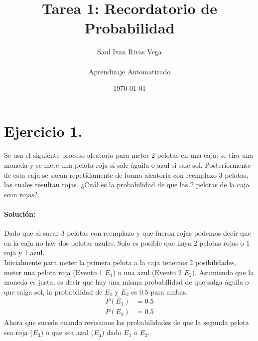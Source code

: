\documentclass[12pt]{article}
\title{Tarea 1: Recordatorio de Probabilidad}
\author{
	Saul Ivan Rivas Vega \\
	\\
	Aprendizaje Automatizado\\
}
\date{\today}
\begin{document}
	\maketitle
	\pagebreak
	\section{Ejercicio 1.}
	  \paragraph{} Se usa el siguiente proceso aleatorio para meter 2 pelotas en una caja: se tira una moneda y
	  se mete una pelota roja si sale águila o azul si sale sol. Posteriormente de esta caja se sacan
	  repetidamente de forma aleatoria con reemplazo 3 pelotas, las cuales resultan rojas. ¿Cuál es
	  la probabilidad de que las 2 pelotas de la caja sean rojas?.
	  \\
	  \paragraph{Solución: } Dado que al sacar 3 pelotas con reemplazo y que fueron rojas podemos decir que en la caja no hay dos pelotas azules. Solo es posible que haya 2 pelotas rojas o 1 roja y 1 azul.
	  \\
	  Inicialmente para meter la primera pelota a la caja tenemos 2 posibilidades, meter una pelota roja (Evento 1 $E_1$) o una azul (Evento 2 $E_2$).
	  Asumiendo que la moneda es justa, es decir que hay una misma probabilidad de que salga águila o que salga sol, la probabilidad de $E_1$ y $E_2$ es $0.5$ para ambas.
	  \begin{equation}
	  \begin{split}
	  	P(E_1)&=0.5\\
	  	P(E_2)&=0.5
	  \end{split}
	  \end{equation}
	  Ahora que sucede cuando revisamos las probabilidades de que la segunda pelota sea roja ($E_3$) o que sea azul ($E_4$) dado $E_1$ o $E_2$.\\
\end{document}
